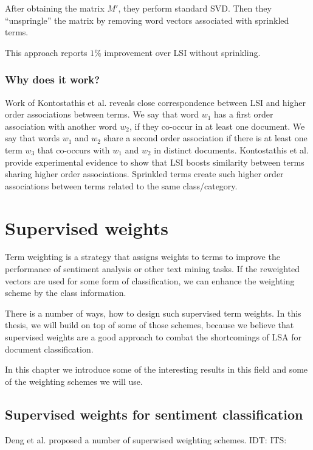     After obtaining the matrix $M'$, they perform standard SVD. 
    Then they ``unspringle'' the matrix by removing word vectors associated with sprinkled terms.
    
    This approach reports $1\%$ improvement over LSI without sprinkling.
    
    \subsubsection{Why does it work?}
    Work of Kontostathis et al. \cite{kontostathis2006framework} reveals close correspondence between LSI and higher order associations between terms. 
    We say that word $w_1$ has a first order association with another word $w_2$, if they co-occur in at least one document. 
    We say that words $w_1$ and $w_2$ share a second order association if there is at least one term $w_3$ that co-occurs with $w_1$ and $w_2$ in distinct documents. 
    Kontostathis et al. provide experimental evidence to show that LSI boosts similarity between terms sharing higher order associations. 
    Sprinkled terms create such higher order associations between terms related to  the same class/category.
        
\section{Supervised weights} \label{sec:supervised:weights}
    
    Term weighting is a strategy that assigns weights to terms to improve the performance of sentiment analysis or other text mining tasks.
    If the reweighted vectors are used for some form of classification,
    we can enhance the weighting scheme by the class information.
    
    There is a number of ways, how to design such supervised term weights.
    In this thesis, we will build on top of some of those schemes,
    because we believe that supervised weights are a good approach to combat the shortcomings of LSA for document classification.
    
    In this chapter we introduce some of the interesting results in this field and some of the weighting schemes we will use.


    \subsection{Supervised weights for sentiment classification}
    Deng et al. \cite{deng2014study} %
    proposed a number of superwised weighting schemes.
    \* %
    IDT:
    ITS:
    
